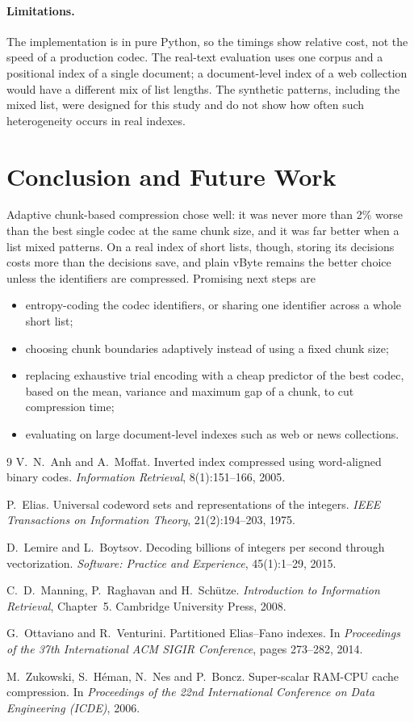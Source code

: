 \documentclass[11pt]{article}
\begin{document}
\paragraph{Limitations.} The implementation is in pure Python, so the timings show relative cost,
not the speed of a production codec. The real-text evaluation uses one corpus and a positional index
of a single document; a document-level index of a web collection would have a different mix of
list lengths. The synthetic patterns, including the mixed list, were designed for this study and do
not show how often such heterogeneity occurs in real indexes.

\section{Conclusion and Future Work}

Adaptive chunk-based compression chose well: it was never more than 2\% worse than the best single
codec at the same chunk size, and it was far better when a list mixed patterns. On a real index of short lists,
though, storing its decisions costs more than the decisions save, and plain vByte remains the better
choice unless the identifiers are compressed. Promising next steps are
\begin{itemize}
  \item entropy-coding the codec identifiers, or sharing one identifier across a whole short list;
  \item choosing chunk boundaries adaptively instead of using a fixed chunk size;
  \item replacing exhaustive trial encoding with a cheap predictor of the best codec, based on the
        mean, variance and maximum gap of a chunk, to cut compression time;
  \item evaluating on large document-level indexes such as web or news collections.
\end{itemize}

\begin{thebibliography}{9}
\small
{} V.~N.~Anh and A.~Moffat. Inverted index compressed using word-aligned binary
codes. \emph{Information Retrieval}, 8(1):151--166, 2005.

 P.~Elias. Universal codeword sets and representations of the integers.
\emph{IEEE Transactions on Information Theory}, 21(2):194--203, 1975.

 D.~Lemire and L.~Boytsov. Decoding billions of integers per second through
vectorization. \emph{Software: Practice and Experience}, 45(1):1--29, 2015.

 C.~D.~Manning, P.~Raghavan and H.~Sch\"utze. \emph{Introduction to
Information Retrieval}, Chapter~5. Cambridge University Press, 2008.

 G.~Ottaviano and R.~Venturini. Partitioned Elias--Fano indexes. In
\emph{Proceedings of the 37th International ACM SIGIR Conference}, pages 273--282, 2014.

 M.~Zukowski, S.~H\'eman, N.~Nes and P.~Boncz. Super-scalar RAM-CPU cache
compression. In \emph{Proceedings of the 22nd International Conference on Data Engineering (ICDE)},
2006.
\end{thebibliography}
\end{document}
